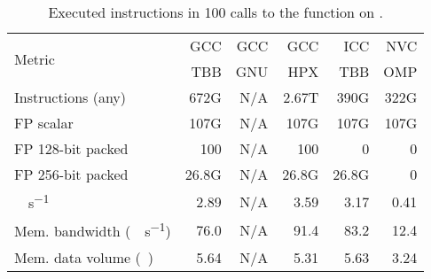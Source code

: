 \begin{table}[t]
	\centering
	\caption{Executed instructions in 100 calls to the function \groupinclscan on \machhydralong.}
	\label{tab:inclscan-hw-counters}
	\begin{adjustbox}{max width=\linewidth}
	\begin{tabular}{lrrrrr}
		\toprule
		\multirow{2}{*}{Metric}                       & GCC   & GCC & GCC   & ICC   & NVC  \\
		                                              & TBB   & GNU & HPX   & TBB   & OMP  \\
		\midrule
		Instructions (any)                            & 672G  & N/A & 2.67T & 390G  & 322G \\
		FP scalar                                     & 107G  & N/A & 107G  & 107G  & 107G \\
		FP 128-bit packed                             & 100   & N/A & 100   & 0     & 0    \\
		FP 256-bit packed                             & 26.8G & N/A & 26.8G & 26.8G & 0    \\
		\unit{\giga\FLOP\per\second}                  & 2.89  & N/A & 3.59  & 3.17  & 0.41 \\
		Mem. bandwidth (\unit{\gibi\byte\per\second}) & 76.0  & N/A & 91.4  & 83.2  & 12.4 \\
		Mem. data volume (\unit{\gibi\byte})          & 5.64  & N/A & 5.31  & 5.63  & 3.24 \\
		\bottomrule
	\end{tabular}
	\end{adjustbox}
\end{table}


